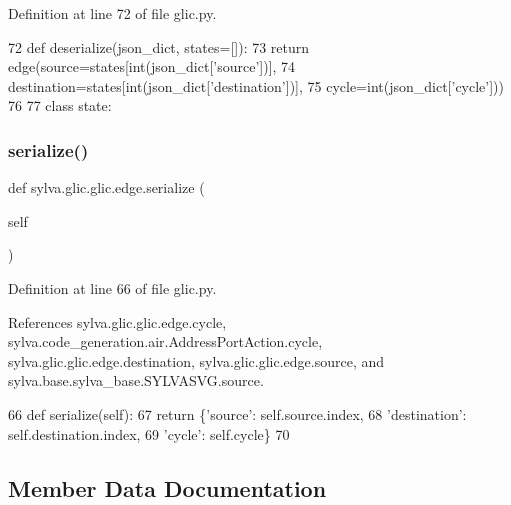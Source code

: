 Definition at line 72 of file glic.\+py.


\begin{DoxyCode}
72         \textcolor{keyword}{def }deserialize(json\_dict, states=[]):
73             \textcolor{keywordflow}{return} edge(source=states[int(json\_dict[\textcolor{stringliteral}{'source'}])],
74                         destination=states[int(json\_dict[\textcolor{stringliteral}{'destination'}])],
75                         cycle=int(json\_dict[\textcolor{stringliteral}{'cycle'}]))
76 
77     \textcolor{keyword}{class }state:
\end{DoxyCode}
\mbox{\label{classsylva_1_1glic_1_1glic_1_1edge_a3fecc788dfeea26b5005b6263dfe3088}} 
\subsubsection{\texorpdfstring{serialize()}{serialize()}}
{\footnotesize\ttfamily def sylva.\+glic.\+glic.\+edge.\+serialize (\begin{DoxyParamCaption}\item[{}]{self }\end{DoxyParamCaption})}



Definition at line 66 of file glic.\+py.



References sylva.\+glic.\+glic.\+edge.\+cycle, sylva.\+code\+\_\+generation.\+air.\+Address\+Port\+Action.\+cycle, sylva.\+glic.\+glic.\+edge.\+destination, sylva.\+glic.\+glic.\+edge.\+source, and sylva.\+base.\+sylva\+\_\+base.\+S\+Y\+L\+V\+A\+S\+V\+G.\+source.


\begin{DoxyCode}
66         \textcolor{keyword}{def }serialize(self):
67             \textcolor{keywordflow}{return} \{\textcolor{stringliteral}{'source'}: self.source.index,
68                     \textcolor{stringliteral}{'destination'}: self.destination.index,
69                     \textcolor{stringliteral}{'cycle'}: self.cycle\}
70 
\end{DoxyCode}


\subsection{Member Data Documentation}
\mbox{\label{classsylva_1_1glic_1_1glic_1_1edge_a30be603f8a2b6d9c9cc2da06ce2444c1}} 
